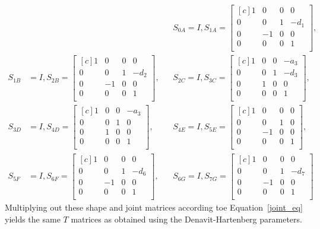 \documentclass{article}
\begin{document}
\begin{align*}
\phantom{T_{01}}&
&& S_{0A} = I,
S_{1A} =
\begin{bmatrix*}[c]
1 & 0 & 0 & 0 \\
0 & 0 & 1 & -d_1 \\
0 & -1 & 0 & 0 \\
0 & 0 & 0 & 1 \\
\end{bmatrix*}, \\
S_{1B} &= I,
S_{2B} =
\begin{bmatrix*}[c]
1 & 0 & 0 & 0 \\
0 & 0 & 1 & -d_2 \\
0 & -1 & 0 & 0 \\
0 & 0 & 0 & 1 \\
\end{bmatrix*},
&& S_{2C} = I,
S_{3C} =
\begin{bmatrix*}[c]
1 & 0 & 0 & -a_3 \\
0 & 0 & 1 & -d_3 \\
0 & 1 & 0 & 0 \\
0 & 0 & 0 & 1 \\
\end{bmatrix*}, \\
S_{3D} &= I,
S_{4D} =
\begin{bmatrix*}[c]
1 & 0 & 0 & -a_3 \\
0 & 0 & 1 & 0 \\
0 & 1 & 0 & 0 \\
0 & 0 & 0 & 1 \\
\end{bmatrix*},
&& S_{4E} = I,
S_{5E} =
\begin{bmatrix*}[c]
1 & 0 & 0 & 0 \\
0 & 0 & 1 & 0 \\
0 & -1 & 0 & 0 \\
0 & 0 & 0 & 1 \\
\end{bmatrix*}, \\
S_{5F} &= I,
S_{6F} =
\begin{bmatrix*}[c]
1 & 0 & 0 & 0 \\
0 & 0 & 1 & -d_6 \\
0 & -1 & 0 & 0 \\
0 & 0 & 0 & 1 \\
\end{bmatrix*},
&& S_{6G} = I,
S_{7G} =
\begin{bmatrix*}[c]
1 & 0 & 0 & 0 \\
0 & 0 & 1 & -d_7 \\
0 & -1 & 0 & 0 \\
0 & 0 & 0 & 1 \\
\end{bmatrix*}
\end{align*}
Multiplying out these shape and joint matrices according toe Equation~\ref{joint_eq} yields the same $T$ matrices as obtained using the Denavit-Hartenberg parameters.
\end{document}

